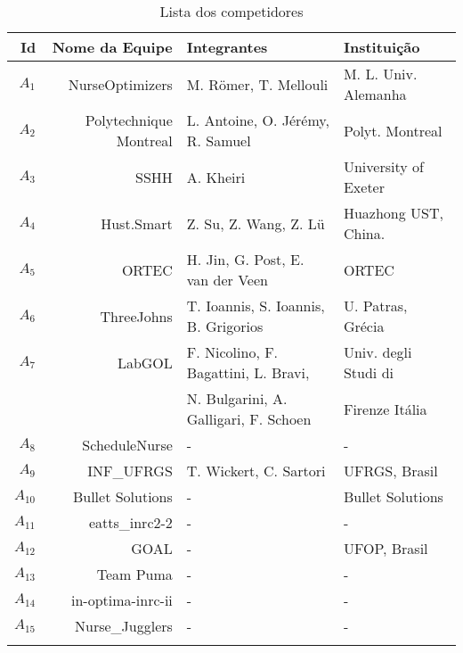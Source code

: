 \documentclass[cic,tc, twoside]{iiufrgs}
\begin{document}
\begin{table}[ht!]
\caption{Lista dos competidores}
\medskip
\small
\label{tab:competidores}
\centering
\begin{tabular}{@{}rrll@{}}
\hline\noalign{\smallskip}
\textbf{Id} & \textbf{Nome da Equipe} & \textbf{Integrantes} & \textbf{Instituição} \\ \hline\noalign{\smallskip}
$A_1$  & NurseOptimizers &   M. Römer, T. Mellouli & M. L. Univ. Alemanha    \\
$A_2$  & Polytechnique Montreal &   L. Antoine, O. Jérémy, R. Samuel & Polyt. Montreal    \\
$A_3$  & SSHH  &    A. Kheiri & University of Exeter\\
$A_4$  & Hust.Smart &  Z. Su, Z. Wang, Z. Lü & Huazhong UST, China.  \\
$A_5$  & ORTEC  & H. Jin, G. Post, E. van der Veen & ORTEC \\
$A_6$  & ThreeJohns & T. Ioannis, S. Ioannis, B. Grigorios & U. Patras, Grécia  \\
$A_7$  & LabGOL & F. Nicolino, F. Bagattini, L. Bravi, & Univ. degli Studi di\\
       &        &  N. Bulgarini, A. Galligari, F. Schoen & Firenze Itália \\
$A_8$ & ScheduleNurse & - & -\\
$A_9$ & INF\_UFRGS & T. Wickert, C. Sartori & UFRGS, Brasil  \\
$A_{10}$ & Bullet Solutions & - & Bullet Solutions\\
$A_{11}$  & eatts\_inrc2-2 & -  &  -  \\
$A_{12}$  & GOAL  & - & UFOP, Brasil   \\
$A_{13}$  & Team Puma & - & - \\
$A_{14}$  & in-optima-inrc-ii & -  & - \\
$A_{15}$  & Nurse\_Jugglers & - & - \\
\noalign{\smallskip}\hline\noalign{\smallskip}
\end{tabular}
\end{table}



\end{document}
